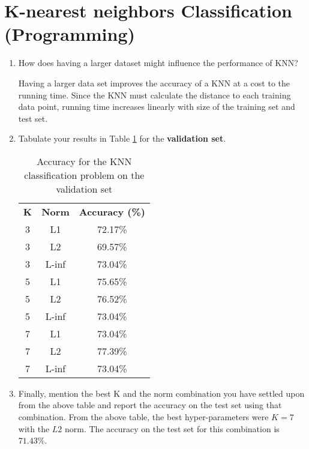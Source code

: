 \section{K-nearest neighbors Classification (Programming)}


\begin{enumerate}
   \item How does having a larger dataset might influence the performance of KNN?

    Having a larger data set improves the accuracy of a KNN at a cost to the running time. 
    Since the KNN must calculate the distance to each training data point, running time increases linearly with size of the training set and test set.
    
    \item Tabulate your results in Table \ref{knnTable} for the \textbf{validation set}.

    \begin{table}[h]
    \centering
    \begin{tabular}{ |c|c|c| } 
     \hline
     \textbf{K} & \textbf{Norm} & \textbf{Accuracy (\%)} \\ 
     3 & L1 & 72.17\% \\ 
     3 & L2 & 69.57\% \\
     3 & L-inf & 73.04\% \\ 
     \hline
     5 & L1 & 75.65\% \\ 
     5 & L2 & 76.52\% \\
     5 & L-inf & 73.04\% \\ 
     \hline
     7 & L1 & 73.04\% \\ 
     7 & L2 & 77.39\% \\
     7 & L-inf & 73.04\% \\ 
     \hline
    \end{tabular}
    \caption{Accuracy for the KNN classification problem on the validation set}
    \label{knnTable}
    \end{table}
    
    \item Finally, mention the best K and the norm combination you have settled upon from the above table and report the accuracy on the test set using that combination.
    \newline\newline
    From the above table, the best hyper-parameters were $K = 7$ with the $L2$ norm. The accuracy on the test set for this combination is $71.43\%$.
\end{enumerate}